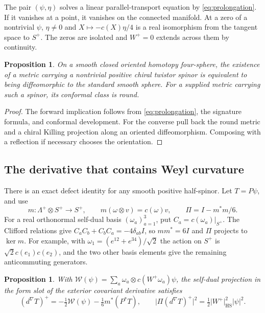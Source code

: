 \documentclass[11pt]{article}
\numberwithin{equation}{section}
\newtheorem{proposition}[theorem]{Proposition}
\newcommand{\abs}[1]{\lvert #1\rvert}
\begin{document}
The pair \((\psi,\eta)\) solves a linear parallel-transport equation
by \eqref{eq:prolongation}. If it vanishes at a point, it vanishes on
the connected manifold. At a zero of a nontrivial \(\psi\),
\(\eta\ne0\) and \(X\mapsto-c(X)\eta/4\) is a real isomorphism from
the tangent space to \(S^+\). The zeros are isolated and \(W^+=0\)
extends across them by continuity.

\begin{proposition}\label{prop:exact-recognition}
On a smooth closed oriented homotopy four-sphere, the existence of a
metric carrying a nontrivial positive chiral twistor spinor is equivalent
to being diffeomorphic to the standard smooth sphere. For a supplied
metric carrying such a spinor, its conformal class is round.
\end{proposition}

\begin{proof}
The forward implication follows from \eqref{eq:prolongation},
the signature formula, and conformal development. For the converse
pull back the round metric and a chiral Killing projection along
an oriented diffeomorphism. Composing with a reflection if necessary
chooses the orientation.
\end{proof}

\subsection{The derivative that contains Weyl curvature}\label{sec:weyl}

There is an exact defect identity for any smooth positive half-spinor.
Let \(T=P\psi\), and use
\[
 m:\Lambda^+\otimes S^+\longrightarrow S^+,\qquad
 m(\omega\otimes v)=c(\omega)v,\qquad \Pi=I-m^*m/6 .
\]
For a real orthonormal self-dual basis \((\omega_a)_{a=1}^3\), put
\(C_a=c(\omega_a)|_{S^+}\). The Clifford relations give
\(C_a C_b+C_b C_a=-4\delta_{ab}I\), so \(mm^*=6I\) and \(\Pi\)
projects to \(\ker m\). For example, with
\(\omega_1=(e^{12}+e^{34})/\sqrt{2}\) the action on \(S^+\) is
\(\sqrt{2}c(e_1)c(e_2)\), and the two other basis elements give the
remaining anticommuting generators.

\begin{proposition}\label{prop:weyl-defect}
With \(\mathcal W(\psi)=\sum_a\omega_a\otimes c(W^+\omega_a)\psi\),
the self-dual projection in the form slot of the exterior covariant
derivative satisfies
\begin{equation}\label{eq:weyl-defect}
 (d^\nabla T)^+=-\tfrac12\mathcal W(\psi)-\tfrac16m^*(P^*T),
 \qquad
 \abs{\Pi(d^\nabla T)^+}^2
   =\tfrac12\abs{W^+}_{\mathrm{HS}}^2\abs{\psi}^2 .
\end{equation}
\end{proposition}
\end{document}
